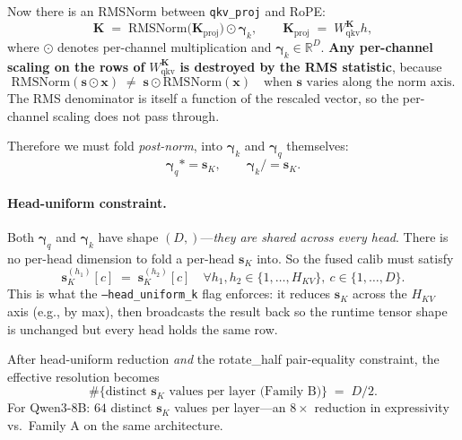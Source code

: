 \documentclass[11pt]{article}
\newcommand{\sk}{\mathbf{s}_K}
\newcommand{\K}{\mathbf{K}}
\begin{document}
Now there is an RMSNorm between \texttt{qkv\_proj} and RoPE:
\begin{equation}
\K \;=\; \mathrm{RMSNorm}\!\big(\K_{\mathrm{proj}}\big) \odot \boldsymbol{\gamma}_k,
\qquad \K_{\mathrm{proj}} \;=\; W_{\mathrm{qkv}}^{\K} h ,
\end{equation}
where $\odot$ denotes per-channel multiplication and $\boldsymbol{\gamma}_k
\in \mathbb{R}^{D}$. \textbf{Any per-channel scaling on the rows of}
$W_{\mathrm{qkv}}^{\K}$ \textbf{is destroyed by the RMS statistic}, because
\begin{equation}
\mathrm{RMSNorm}(\mathbf{s} \odot \mathbf{x}) \;\neq\; \mathbf{s} \odot \mathrm{RMSNorm}(\mathbf{x})
\quad\text{when } \mathbf{s} \text{ varies along the norm axis.}
\label{eq:rms-no-commute}
\end{equation}
The RMS denominator is itself a function of the rescaled vector, so the
per-channel scaling does not pass through.

Therefore we must fold \emph{post-norm}, into $\boldsymbol{\gamma}_k$ and
$\boldsymbol{\gamma}_q$ themselves:
\begin{equation}
\boldsymbol{\gamma}_q \mathrel{*{=}} \sk, \qquad \boldsymbol{\gamma}_k \mathrel{/{=}} \sk .
\label{eq:fold-B}
\end{equation}

\paragraph{Head-uniform constraint.} Both $\boldsymbol{\gamma}_q$ and
$\boldsymbol{\gamma}_k$ have shape $(D,)$---\emph{they are shared across
every head}. There is no per-head dimension to fold a per-head $\sk$ into.
So the fused calib must satisfy
\begin{equation}
\sk^{(h_1)}[c] \;=\; \sk^{(h_2)}[c] \quad \forall h_1, h_2 \in \{1,\ldots,H_{KV}\},\ c \in \{1,\ldots,D\} .
\label{eq:head-uniform}
\end{equation}
This is what the \texttt{--head\_uniform\_k} flag enforces: it reduces
$\sk$ across the $H_{KV}$ axis (e.g., by max), then broadcasts the
result back so the runtime tensor shape is unchanged but every head
holds the same row.

After head-uniform reduction \emph{and} the rotate\_half pair-equality
constraint, the effective resolution becomes
\begin{equation}
\#\{\text{distinct } \sk \text{ values per layer (Family B)}\}
\;=\; D/2 .
\label{eq:resolution-B}
\end{equation}
For Qwen3-8B: \textbf{$64$} distinct $\sk$ values per layer---an
\textbf{$8\times$} reduction in expressivity vs.\ Family A on the same
architecture.
\end{document}
